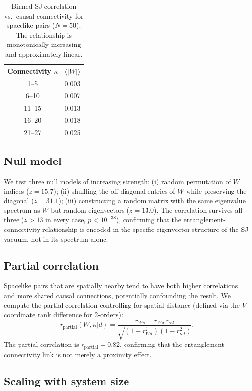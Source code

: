 \documentclass[aps,prd,twocolumn,superscriptaddress,nofootinbib]{revtex4-2}
\begin{document}
\begin{table}[h]
\centering
\begin{tabular}{cc}
\toprule
Connectivity $\kappa$ & $\langle |W| \rangle$ \\
\midrule
1--5 & 0.003 \\
6--10 & 0.007 \\
11--15 & 0.013 \\
16--20 & 0.018 \\
21--27 & 0.025 \\
\bottomrule
\end{tabular}
\caption{Binned SJ correlation vs.\ causal connectivity for spacelike pairs ($N = 50$). The relationship is monotonically increasing and approximately linear.}
\label{tab:binned}
\end{table}

\subsection{Null model}

We test three null models of increasing strength: (i) random permutation of $W$ indices ($z = 15.7$); (ii) shuffling the off-diagonal entries of $W$ while preserving the diagonal ($z = 31.1$); (iii) constructing a random matrix with the same eigenvalue spectrum as $W$ but random eigenvectors ($z = 13.0$). The correlation survives all three ($z > 13$ in every case, $p < 10^{-38}$), confirming that the entanglement-connectivity relationship is encoded in the specific eigenvector structure of the SJ vacuum, not in its spectrum alone.

\subsection{Partial correlation}

Spacelike pairs that are spatially nearby tend to have both higher correlations and more shared causal connections, potentially confounding the result. We compute the partial correlation controlling for spatial distance (defined via the $V$-coordinate rank difference for 2-orders):
\begin{equation}
r_{\text{partial}}(W, \kappa | d) = \frac{r_{W\kappa} - r_{Wd}\, r_{\kappa d}}{\sqrt{(1 - r_{Wd}^2)(1 - r_{\kappa d}^2)}}.
\end{equation}
The partial correlation is $r_{\text{partial}} = 0.82$, confirming that the entanglement-connectivity link is not merely a proximity effect.

\subsection{Scaling with system size}
\end{document}
